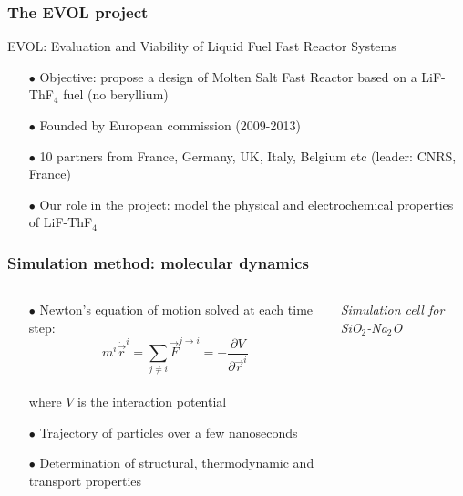 \documentclass{beamer}
\begin{document}
\begin{frame}
   \frametitle{The EVOL project}
   EVOL: Evaluation and Viability of Liquid Fuel Fast Reactor Systems
         \vspace{0.5cm}
   \begin{itemize}
      \item[$\bullet$] Objective: propose a design of \alert{Molten Salt Fast Reactor} based on a LiF-ThF$_4$ fuel (no beryllium)
         \vspace{0.5cm}
      \item[$\bullet$] Founded by European commission (2009-2013)
         \vspace{0.5cm}
      \item[$\bullet$] 10 partners from France, Germany, UK, Italy, Belgium etc (leader: CNRS, France)
         \vspace{0.5cm}
      \item[$\bullet$] Our role in the project: model the physical and electrochemical properties of LiF-ThF$_4$
   \end{itemize}
\end{frame}

\begin{frame}
   \frametitle{Simulation method: molecular dynamics}
   \begin{columns}
      \begin{column}{6cm}
         \begin{itemize}
            \item[$\bullet$] Newton's equation of motion solved at each time step:\\
            \begin{equation}m^i\ddot{\vec{r}}^i=\sum_{j\ne i}\vec{F}^{j\rightarrow i}=-\frac{\partial V}{\partial \vec{r}^i}\nonumber\end{equation}\\
            where $V$ is the \alert{interaction potential}
  
            \item[$\bullet$] Trajectory of particles over a few nanoseconds
            \item[$\bullet$] Determination of \alert{structural}, \alert{thermodynamic} and \alert{transport} properties
         \end{itemize}
      \end{column}
      \begin{column}{6cm}
         \begin{figure}
         \end{figure}
         \vspace{-0.5cm}
         \begin{center}
            {\small \it Simulation cell for SiO$_2$-Na$_2$O}
         \end{center}
      \end{column}
   \end{columns}
\end{frame}
\end{document}
